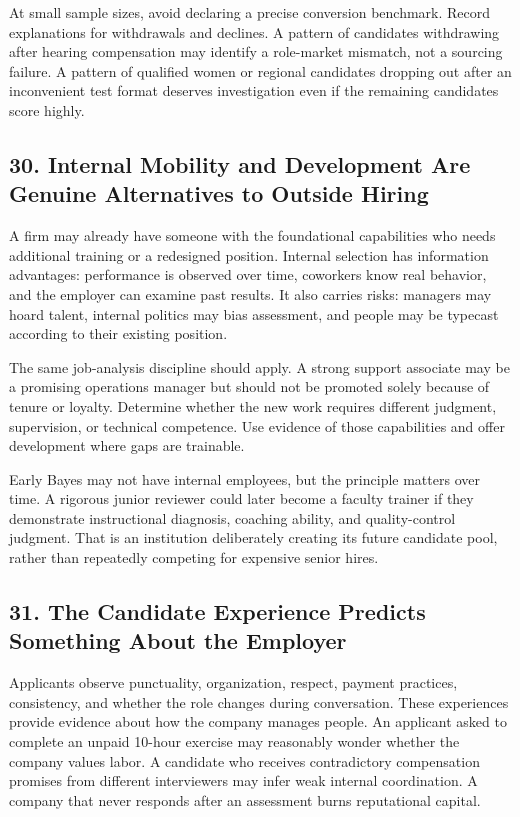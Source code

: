 At small sample sizes, avoid declaring a precise conversion benchmark. Record explanations for withdrawals and declines. A pattern of candidates withdrawing after hearing compensation may identify a role-market mismatch, not a sourcing failure. A pattern of qualified women or regional candidates dropping out after an inconvenient test format deserves investigation even if the remaining candidates score highly.

\subsection*{30. Internal Mobility and Development Are Genuine Alternatives to Outside Hiring}

A firm may already have someone with the foundational capabilities who needs additional training or a redesigned position. Internal selection has information advantages: performance is observed over time, coworkers know real behavior, and the employer can examine past results. It also carries risks: managers may hoard talent, internal politics may bias assessment, and people may be typecast according to their existing position.

The same job-analysis discipline should apply. A strong support associate may be a promising operations manager but should not be promoted solely because of tenure or loyalty. Determine whether the new work requires different judgment, supervision, or technical competence. Use evidence of those capabilities and offer development where gaps are trainable.

Early Bayes may not have internal employees, but the principle matters over time. A rigorous junior reviewer could later become a faculty trainer if they demonstrate instructional diagnosis, coaching ability, and quality-control judgment. That is an institution deliberately creating its future candidate pool, rather than repeatedly competing for expensive senior hires.

\subsection*{31. The Candidate Experience Predicts Something About the Employer}

Applicants observe punctuality, organization, respect, payment practices, consistency, and whether the role changes during conversation. These experiences provide evidence about how the company manages people. An applicant asked to complete an unpaid 10-hour exercise may reasonably wonder whether the company values labor. A candidate who receives contradictory compensation promises from different interviewers may infer weak internal coordination. A company that never responds after an assessment burns reputational capital.

